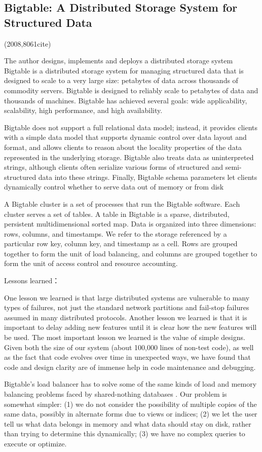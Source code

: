\documentclass[a4paper,twoside]{scrbook}
\begin{document}
\subsection{Bigtable: A Distributed Storage System for Structured Data \cite{chang2008bigtable}}
(2008,8061cite)\par
The author designs, implements and deploys a distributed storage system
Bigtable is a distributed storage system for managing structured data that is designed to scale to a very large size: petabytes of data across thousands of commodity servers.
Bigtable is designed to reliably scale to petabytes of data and thousands of machines. Bigtable has achieved several goals: wide applicability, scalability, high performance, and high availability. 
\par

Bigtable does not support a full relational data model; instead, it provides clients with a simple data model that supports dynamic control over data layout and format, and allows clients to reason about the locality properties of the data represented in the underlying storage.
Bigtable also treats data as uninterpreted strings, although clients often serialize various forms of structured and semi-structured data into these strings. 
Finally, Bigtable schema  parameters let clients dynamically control whether to serve data out of memory or from disk
\par
A Bigtable cluster is a set of processes that run the Bigtable software. Each cluster serves a set of tables. A table in Bigtable is a sparse, distributed, persistent multidimensional sorted map. Data is organized into three dimensions: rows, columns, and timestamps.
We refer to the storage referenced by a particular row key, column key, and timestamp as a cell. Rows are grouped together to form the unit of load balancing, and columns are grouped together to form the unit of access control and resource accounting.
\par
Lessons learned：\par
One lesson we learned is that large distributed systems are vulnerable to many types of failures, not just the standard network partitions and fail-stop failures assumed in many distributed protocols. 
Another lesson we learned is that it is important to delay adding new features until it is clear how the new features will be used.
The most important lesson we learned is the value of simple designs. Given both the size of our system (about 100,000 lines of non-test code), as well as the fact that code evolves over time in unexpected ways, we have found that code and design clarity are of immense help in code maintenance and debugging.
\par
Bigtable’s load balancer has to solve some of the same kinds of load and memory balancing problems faced by shared-nothing databases . 
Our problem is somewhat simpler: 
(1) we do not consider the possibility of multiple copies of the same data, possibly in alternate forms due to views or indices; 
(2) we let the user tell us what data belongs in memory and what data should stay on disk, rather than trying to determine this dynamically; 
(3) we have no complex queries to execute or optimize.
\end{document}
